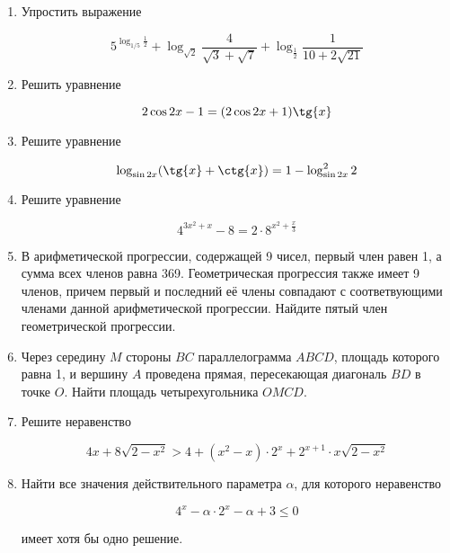\documentclass[11pt,a5paper]{report}
\begin{document}
\begin{enumerate}
\item Упростить выражение

$$ 5^{\log_{1/5}{\frac{1}{2}}} + \log_{\sqrt{2}} {\frac{4}{\sqrt{3} + \sqrt{7}}} + \log_{\frac{1}{2}} \frac{1}{10 + 2 \sqrt{21}}$$

\item Решить уравнение

$$2 \cos{2x} - 1 = (2 \cos{2x} + 1) \tg{x}$$

\item Решите уравнение

$$ \log_{\sin{2x}}(\tg{x} + \ctg{x}) = 1 - \log_{\sin{2x}}^2 {2}$$

\item Решите уравнение

$$ 4^{3x^2 + x} - 8 = 2 \cdot 8^{x^2 + \frac{x}{3}}$$

\item В арифметической прогрессии, содержащей 9 чисел, первый член равен 1, а сумма всех членов равна 369. Геометрическая прогрессия также имеет 9 членов, причем первый и последний её члены совпадают с соответвующими членами данной арифметической прогрессии. Найдите пятый член геометрической прогрессии.

\item Через середину $M$ стороны $BC$ параллелограмма $ABCD$, площадь которого равна 1, и вершину $A$ проведена прямая, пересекающая диагональ $BD$ в точке $O$. Найти площадь четырехугольника $OMCD$.

\item Решите неравенство

$$4x + 8 \sqrt{2 - x^2} > 4 + (x^2 - x) \cdot 2^x + 2^{x+1} \cdot x \sqrt{2 - x^2}$$

\item Найти все значения действительного параметра $\alpha$, для которого неравенство

$$ 4^x - \alpha \cdot 2^x - \alpha + 3 \leqslant 0$$

имеет хотя бы одно решение.

\end{enumerate}
\newpage
\end{document}
